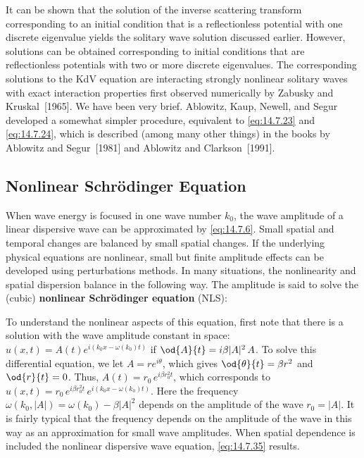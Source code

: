 It can be shown that the solution of the inverse scattering transform corresponding to an initial condition that is a reflectionless potential with one discrete eigenvalue yields the solitary wave solution discussed earlier.  However, solutions can be obtained corresponding to initial conditions that are reflectionless potentials with two or more discrete eigenvalues.  The corresponding solutions to the KdV equation are interacting strongly nonlinear solitary waves with exact interaction properties first observed numerically by Zabusky and Kruskal~[1965].  We have been very brief.  Ablowitz, Kaup, Newell, and Segur developed a somewhat simpler procedure, equivalent to \eqref{eq:14.7.23} and \eqref{eq:14.7.24}, which is described (among many other things) in the books by Ablowitz and Segur~[1981] and Ablowitz and Clarkson~[1991].

\subsection{Nonlinear Schr\"odinger Equation}
\label{sec:nonlinear-schrodinger}

When wave energy is focused in one wave number $k_0$, the wave amplitude of a linear dispersive wave can be approximated by \eqref{eq:14.7.6}.  Small spatial and temporal changes are balanced by small spatial changes.  If the underlying physical equations are nonlinear, small but finite amplitude effects can be developed using perturbations methods.  In many situations, the nonlinearity and spatial dispersion balance in the following way.  The amplitude is said to solve the (cubic) \textbf{nonlinear Schr\"odinger equation} (NLS):

To understand the nonlinear aspects of this equation, first note that there is a solution with the wave amplitude constant in space: $u(x,t) = A(t)e^{i(k_0 x - \omega(k_0)t)}$ if $\od{A}{t} = i\beta|A|^2\,A$.  To solve this differential equation, we let $A = re^{i\theta}$, which gives $\od{\theta}{t} = \beta r^2$ and $\od{r}{t} = 0$.  Thus, $A(t) = r_0\,e^{i\beta r_0^2 t}$, which corresponds to $u(x,t) = r_0\,e^{i\beta r_0^2 t}\,e^{i(k_0 x - \omega(k_0)t)}$.  Here the frequency $\omega(k_0, |A|) = \omega(k_0) - \beta|A|^2$ depends on the amplitude of the wave $r_0 = |A|$.  It is fairly typical that the frequency depends on the amplitude of the wave in this way as an approximation for small wave amplitudes.  When spatial dependence is included the nonlinear dispersive wave equation, \eqref{eq:14.7.35} results.

